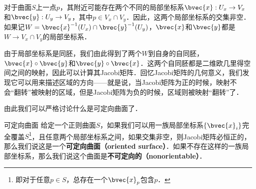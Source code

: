 
对于曲面$S$上一点$p$，其附近可能存在两个不同的局部坐标系$\bvec{x}:U_x\to V_x$和$\bvec{y}:U_y\to V_y$，其中$p\in V_x\cap V_y$．因此，这两个局部坐标系的交集非空．如果记$W=\bvec{x}^{-1}(U_x)\cap\bvec{y}^{-1}(U_y)$，$\bvec{x}$和$\bvec{y}$都是$W\to V_x\cap V_y$的局部坐标系．

由于局部坐标系是同胚，我们由此得到了两个$W$到自身的自同胚，$\bvec{x}\circ\bvec{y}$和$\bvec{y}\circ\bvec{x}$．这两个自同胚都是二维欧几里得空间之间的映射，因此可以计算其Jacobi矩阵．回忆Jacobi矩阵的几何意义，我们发现它可以用来描述区域的方向——就是说，当Jacobi矩阵为正的时候，映射不会“翻转”被映射的区域，但是Jacobi矩阵为负的时候，区域则被映射“翻转”了．

由此我们可以严格讨论什么是可定向曲面了．

\begin{definition}{可定向曲面}
给定一个正则曲面$S$，如果我们可以用一族局部坐标系$\{\bvec{x}_i\}$完全覆盖$S$\footnote{即对于任意$p\in S$，总存在一个$\bvec{x}_p$包含$p$．}，且任意两个局部坐标系之间，如果交集非空，则Jacobi矩阵必恒正的，那么我们说这是一个\textbf{可定向曲面（oriented surface）}．如果不存在这样的一族局部坐标系，那么我们说这个曲面是\textbf{不可定向的（nonorientable）}．
\end{definition}







